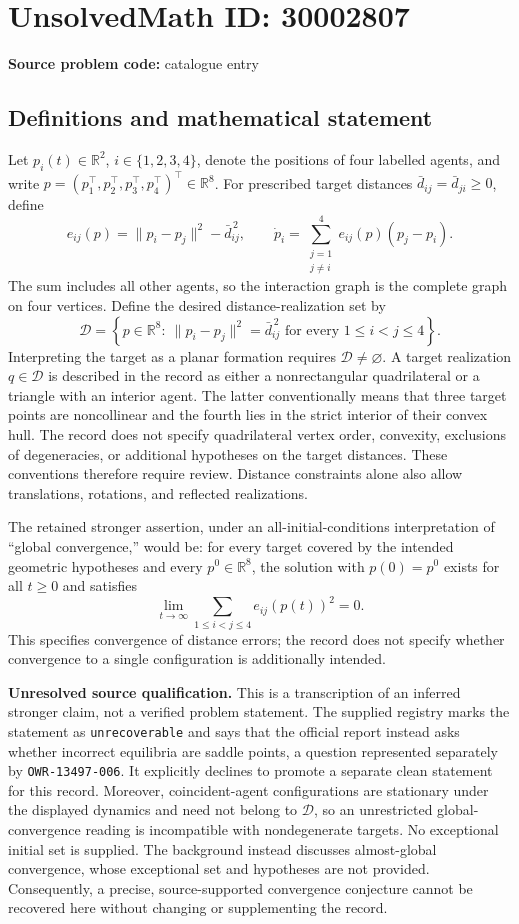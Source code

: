 \documentclass[11pt]{article}
\newcommand{\R}{\mathbb{R}}
\begin{document}
\section*{UnsolvedMath ID: 30002807}
\textbf{Source problem code:} catalogue entry
\subsection{Definitions and mathematical statement}
Let \(p_i(t)\in\R^2\), \(i\in\{1,2,3,4\}\), denote the positions of four labelled agents, and write \(p=(p_1^\top,p_2^\top,p_3^\top,p_4^\top)^\top\in\R^8\). For prescribed target distances \(\bar d_{ij}=\bar d_{ji}\geq0\), define
\[
e_{ij}(p)=\lVert p_i-p_j\rVert^2-\bar d_{ij}^{\,2},\qquad
\dot p_i=\sum_{\substack{j=1\\j\ne i}}^4 e_{ij}(p)(p_j-p_i).
\]
The sum includes all other agents, so the interaction graph is the complete graph on four vertices. Define the desired distance-realization set by
\[
\mathcal D=\left\{p\in\R^8:\ \lVert p_i-p_j\rVert^2=\bar d_{ij}^{\,2}\text{ for every }1\leq i<j\leq4\right\}.
\]
Interpreting the target as a planar formation requires \(\mathcal D\ne\varnothing\). A target realization \(q\in\mathcal D\) is described in the record as either a nonrectangular quadrilateral or a triangle with an interior agent. The latter conventionally means that three target points are noncollinear and the fourth lies in the strict interior of their convex hull. The record does not specify quadrilateral vertex order, convexity, exclusions of degeneracies, or additional hypotheses on the target distances. These conventions therefore require review. Distance constraints alone also allow translations, rotations, and reflected realizations.

The retained stronger assertion, under an all-initial-conditions interpretation of ``global convergence,'' would be: for every target covered by the intended geometric hypotheses and every \(p^0\in\R^8\), the solution with \(p(0)=p^0\) exists for all \(t\geq0\) and satisfies
\[
\lim_{t\to\infty}\sum_{1\leq i<j\leq4}e_{ij}(p(t))^2=0.
\]
This specifies convergence of distance errors; the record does not specify whether convergence to a single configuration is additionally intended.

\textbf{Unresolved source qualification.} This is a transcription of an inferred stronger claim, not a verified problem statement. The supplied registry marks the statement as \texttt{unrecoverable} and says that the official report instead asks whether incorrect equilibria are saddle points, a question represented separately by \texttt{OWR-13497-006}. It explicitly declines to promote a separate clean statement for this record. Moreover, coincident-agent configurations are stationary under the displayed dynamics and need not belong to \(\mathcal D\), so an unrestricted global-convergence reading is incompatible with nondegenerate targets. No exceptional initial set is supplied. The background instead discusses almost-global convergence, whose exceptional set and hypotheses are not provided. Consequently, a precise, source-supported convergence conjecture cannot be recovered here without changing or supplementing the record.
\end{document}
